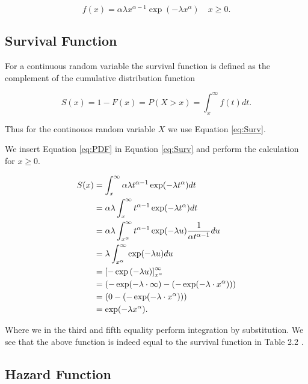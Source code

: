 \documentclass[a4paper,oneside]{memoir}
\begin{document}
\begin{equation}
f(x) = \alpha\lambda x^{\alpha-1}\exp(-\lambda x^\alpha)\quad x\geq 0. \label{eq:PDF}
\end{equation}

\hypertarget{survival-function}{%
\subsection{Survival Function}\label{survival-function}}

For a continuous random variable the survival function is defined as the complement of the cumulative distribution function

\begin{equation}
S(x)=1-F(x)=P(X>x)=\int^{\infty}_x f(t) dt. \label{eq:Surv}
\end{equation}

Thus for the continouos random variable \(X\) we use Equation \eqref{eq:Surv}.

We insert Equation \eqref{eq:PDF} in Equation \eqref{eq:Surv} and perform the calculation for \(x\geq 0\).

\begin{align}
S(x)&=\int^{\infty}_x \alpha\lambda t^{\alpha-1}\exp(-\lambda t^\alpha) dt \notag \\
    &=\alpha\lambda\int^{\infty}_x t^{\alpha-1}\exp(-\lambda t^\alpha) dt \notag \\
    &=\alpha\lambda\int_{x^{\alpha}}^\infty t^{\alpha-1}\exp(-\lambda u) \frac{1}{\alpha t^{\alpha-1}} du \notag \\
    &=\lambda \int_{x^{\alpha}}^\infty \exp(-\lambda u) du \notag \\
    &=\left[-\exp\left(-\lambda u\right)\right]_{x^\alpha}^\infty \notag \\
    &=\left(-\exp(-\lambda\cdot \infty)-(-\exp(-\lambda\cdot x^\alpha))\right) \notag \\
    &=\left(0-(-\exp(-\lambda\cdot x^\alpha))\right) \notag \\
    &=\exp(-\lambda x^\alpha) \label{eq:WeiSurv}.
\end{align}

Where we in the third and fifth equality perform integration by substitution. We see that the above function is indeed equal to the survival function in Table 2.2 \citep{Klein2003}.

\hypertarget{hazard-function}{%
\subsection{Hazard Function}\label{hazard-function}}
\end{document}
